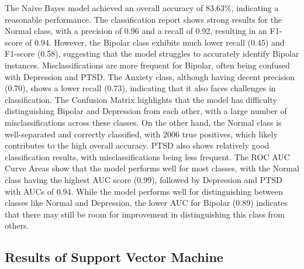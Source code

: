 \noindent
The Naive Bayes model achieved an overall accuracy of 83.63\%, indicating a reasonable performance. The classification report shows strong results for the Normal class, with a precision of 0.96 and a recall of 0.92, resulting in an F1-score of 0.94. However, the Bipolar class exhibits much lower recall (0.45) and F1-score (0.58), suggesting that the model struggles to accurately identify Bipolar instances. Misclassifications are more frequent for Bipolar, often being confused with Depression and PTSD. The Anxiety class, although having decent precision (0.70), shows a lower recall (0.73), indicating that it also faces challenges in classification. The Confusion Matrix highlights that the model has difficulty distinguishing Bipolar and Depression from each other, with a large number of misclassifications across these classes. On the other hand, the Normal class is well-separated and correctly classified, with 2006 true positives, which likely contributes to the high overall accuracy. PTSD also shows relatively good classification results, with misclassifications being less frequent. The ROC AUC Curve Areas show that the model performs well for most classes, with the Normal class having the highest AUC score (0.99), followed by Depression and PTSD with AUCs of 0.94. While the model performs well for distinguishing between classes like Normal and Depression, the lower AUC for Bipolar (0.89) indicates that there may still be room for improvement in distinguishing this class from others.


\subsection{Results of Support Vector Machine}

